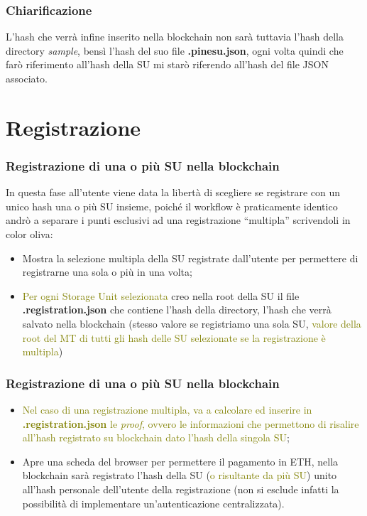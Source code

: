 \documentclass{beamer}
\begin{document}
\begin{frame}
	\frametitle{Chiarificazione}
	L'hash che verrà infine inserito nella blockchain non sarà tuttavia l'hash della directory \emph{sample}, bensì l'hash del suo file \textbf{.pinesu.json}, ogni volta quindi che farò riferimento all'hash della SU mi starò riferendo all'hash del file JSON associato.
\end{frame}
\section{Registrazione}
\begin{frame}
	\frametitle{Registrazione di una o più SU nella blockchain}
	In questa fase all'utente viene data la libertà di scegliere se registrare con un unico hash una o più SU insieme, poiché il workflow è praticamente identico andrò a separare i punti esclusivi ad una registrazione “multipla” scrivendoli in color oliva:
	\begin{itemize}
		\item Mostra la selezione multipla della SU registrate dall'utente per permettere di registrarne una sola o più in una volta;
		\item \textcolor{olive}{Per ogni Storage Unit selezionata} creo nella root della SU il file \textbf{.registration.json} che contiene l'hash della directory, l'hash che verrà salvato nella blockchain (stesso valore se registriamo una sola SU, \textcolor{olive}{valore della root del MT di tutti gli hash delle SU selezionate se la registrazione è multipla})
	\end{itemize}
\end{frame}
\begin{frame}
	\frametitle{Registrazione di una o più SU nella blockchain}
	\begin{itemize}
		\item \textcolor{olive}{Nel caso di una registrazione multipla, va a calcolare ed inserire in \textbf{.registration.json} le \emph{proof}, ovvero le informazioni che permettono di risalire all'hash registrato su blockchain dato l'hash della singola SU};
		\item Apre una scheda del browser per permettere il pagamento in ETH, nella blockchain sarà registrato l'hash della SU (\textcolor{olive}{o risultante da più SU}) unito all'hash personale dell'utente della registrazione (non si esclude infatti la possibilità di implementare un'autenticazione centralizzata).
	\end{itemize}
\end{frame}
\end{document}
